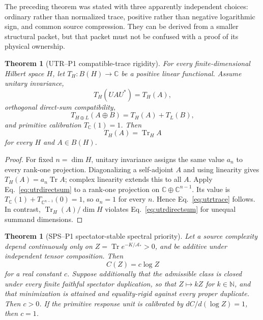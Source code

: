 \documentclass[11pt,a4paper]{article}
\newtheorem{theorem}[definition]{Theorem}
\theoremstyle{remark}
\begin{document}
The preceding theorem was stated with three apparently independent choices:
ordinary rather than normalized trace, positive rather than negative
logarithmic sign, and common source compression.  They can be derived from a
smaller structural packet, but that packet must not be confused with a proof
of its physical ownership.

\begin{theorem}[UTR--P1 compatible-trace rigidity]
For every finite-dimensional Hilbert space $H$, let
$T_H:B(H)\to\mathbb C$ be a positive linear functional.  Assume unitary
invariance,
\begin{equation}
 T_H(UAU^*)=T_H(A),
 \label{eq:utrunitary}
\end{equation}
orthogonal direct-sum compatibility,
\begin{equation}
 T_{H\oplus L}(A\oplus B)=T_H(A)+T_L(B),
 \label{eq:utrdirectsum}
\end{equation}
and primitive calibration $T_{\mathbb C}(1)=1$.  Then
\begin{equation}
 T_H(A)=\operatorname{Tr}_H A
 \label{eq:utrtrace}
\end{equation}
for every $H$ and $A\in B(H)$.
\label{thm:utrtrace}
\end{theorem}

\begin{proof}
For fixed $n=\dim H$, unitary invariance assigns the same value $a_n$ to
every rank-one projection.  Diagonalizing a self-adjoint $A$ and using
linearity gives $T_H(A)=a_n\operatorname{Tr}A$; complex linearity extends this
to all $A$.  Apply Eq.~\eqref{eq:utrdirectsum} to a rank-one projection on
$\mathbb C\oplus\mathbb C^{n-1}$.  Its value is
$T_{\mathbb C}(1)+T_{\mathbb C^{n-1}}(0)=1$, so $a_n=1$ for every $n$.
Hence Eq.~\eqref{eq:utrtrace} follows.  In contrast,
$\operatorname{Tr}_H(A)/\dim H$ violates Eq.~\eqref{eq:utrdirectsum} for
unequal summand dimensions.
\end{proof}

\begin{theorem}[SPS--P1 spectator-stable spectral priority]
Let a source complexity depend continuously only on
$Z=\operatorname{Tr}e^{-K/\mathcal A_*}>0$, and be additive under independent
tensor composition.  Then
\begin{equation}
 C(Z)=c\log Z
 \label{eq:spslog}
\end{equation}
for a real constant $c$.  Suppose additionally that the admissible class is
closed under every finite faithful spectator duplication, so that
$Z\mapsto kZ$ for $k\in\mathbb N$, and that minimization is attained and
equality-rigid against every proper duplicate.  Then $c>0$.  If the primitive
response unit is calibrated by
$dC/d(\log Z)=1$, then $c=1$.
\label{thm:spssign}
\end{theorem}
\end{document}
